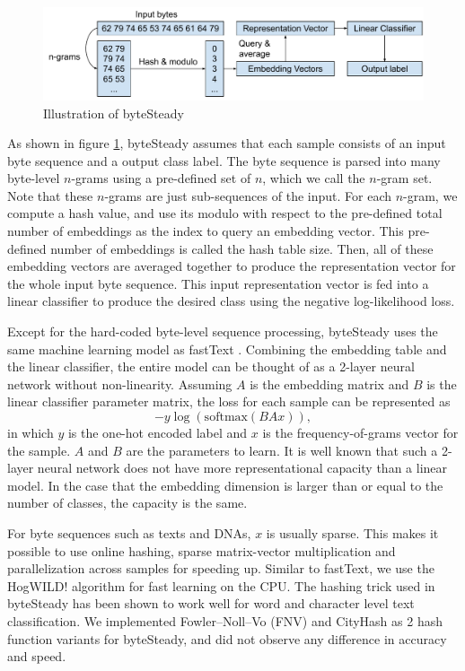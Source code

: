 \documentclass{article}
\begin{document}
\begin{figure}[t]
  \centering
  \includegraphics[width=\textwidth]{model}
  \caption{Illustration of byteSteady}
  \label{fig:model}
\end{figure}

As shown in figure \ref{fig:model}, byteSteady assumes that each sample consists of an input byte sequence and a output class label. The byte sequence is parsed into many byte-level \(n\)-grams using a pre-defined set of \(n\), which we call the \(n\)-gram set. Note that these \(n\)-grams are just sub-sequences of the input. For each \(n\)-gram, we compute a hash value, and use its modulo with respect to the pre-defined total number of embeddings as the index to query an embedding vector. This pre-defined number of embeddings is called the hash table size. Then, all of these embedding vectors are averaged together to produce the representation vector for the whole input byte sequence. This input representation vector is fed into a linear classifier to produce the desired class using the negative log-likelihood loss.

Except for the hard-coded byte-level sequence processing, byteSteady uses the same machine learning model as fastText \cite{JGBM16}. Combining the embedding table and the linear classifier, the entire model can be thought of as a 2-layer neural network without non-linearity. Assuming \(A\) is the embedding matrix and \(B\) is the linear classifier parameter matrix, the loss for each sample can be represented as
\begin{equation}
\label{eq:loss}
-y \log(\mathrm{softmax}(BAx)),
\end{equation}
in which \(y\) is the one-hot encoded label and \(x\) is the frequency-of-grams vector for the sample. \(A\) and \(B\) are the parameters to learn. It is well known that such a 2-layer neural network does not have more representational capacity than a linear model. In the case that the embedding dimension is larger than or equal to the number of classes, the capacity is the same.

For byte sequences such as texts and DNAs, \(x\) is usually sparse. This makes it possible to use online hashing, sparse matrix-vector multiplication and parallelization across samples for speeding up. Similar to fastText, we use the HogWILD! \cite{RRWF11} algorithm for fast learning on the CPU. The hashing trick \cite{WDLSA09} used in byteSteady has been shown to work well for word and character level text classification. We implemented Fowler–Noll–Vo (FNV) and CityHash as 2 hash function variants for byteSteady, and did not observe any difference in accuracy and speed.
\end{document}
